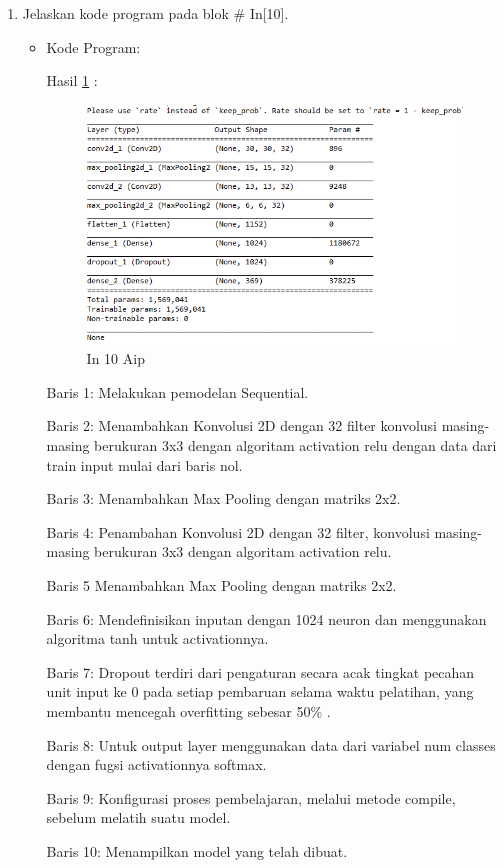 \begin{enumerate}
\item Jelaskan kode program pada blok \# In[10].
\begin{itemize}
\item Kode Program:

\par Hasil \ref{in10aip} :
\begin{figure}[!hbtp]
\centering
\includegraphics[scale=0.7]{figures/AIP/prak10.PNG}
\caption{In 10 Aip}
\label{in10aip}
\end{figure}
\par Baris 1: Melakukan pemodelan Sequential.
\par Baris 2: Menambahkan Konvolusi 2D dengan 32 filter konvolusi masing-masing berukuran 3x3 dengan algoritam activation relu dengan data dari train input mulai dari baris nol.
\par Baris 3: Menambahkan Max Pooling dengan matriks 2x2.
\par Baris 4: Penambahan Konvolusi 2D dengan 32 filter, konvolusi masing-masing berukuran 3x3 dengan algoritam activation relu.
\par Baris 5 Menambahkan Max Pooling dengan matriks 2x2.
\par Baris 6: Mendefinisikan inputan dengan 1024 neuron dan menggunakan algoritma tanh untuk activationnya.
\par Baris 7: Dropout terdiri dari pengaturan secara acak tingkat pecahan unit input ke 0 pada setiap pembaruan selama waktu pelatihan, yang membantu mencegah overfitting sebesar 50\% .
\par Baris 8: Untuk output layer menggunakan data dari variabel num classes dengan fugsi activationnya softmax.
\par Baris 9: Konfigurasi proses pembelajaran, melalui metode compile, sebelum melatih suatu model.
\par Baris 10: Menampilkan model yang telah dibuat.
\end{itemize}
\par


\end{enumerate}
